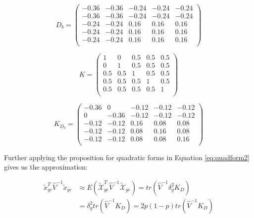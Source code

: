 \documentclass[]{book}
\theoremstyle{definition}
\theoremstyle{definition}
\theoremstyle{definition}
\theoremstyle{remark}
\begin{document}
\begin{equation*} 
D_b = 
\left(\begin{array}{ccccc}
-0.36 & -0.36 & -0.24 & -0.24 & -0.24\\
-0.36 & -0.36 & -0.24 & -0.24 & -0.24\\
-0.24 & -0.24 & 0.16 & 0.16 & 0.16\\
-0.24 & -0.24 & 0.16 & 0.16 & 0.16\\
-0.24 & -0.24 & 0.16 & 0.16 & 0.16\\
\end{array}\right)
\end{equation*}

\begin{equation*} 
K = 
\left(\begin{array}{ccccc}
1 & 0 & 0.5 & 0.5 & 0.5\\
0 & 1 & 0.5 & 0.5 & 0.5\\
0.5 & 0.5 & 1 & 0.5 & 0.5\\
0.5 & 0.5 & 0.5 & 1 & 0.5\\
0.5 & 0.5 & 0.5 & 0.5 & 1\\
\end{array}\right)
\end{equation*}

\begin{equation*} 
K_{D_b} = 
\left(\begin{array}{ccccc}
-0.36 & 0 & -0.12 & -0.12 & -0.12\\
0 & -0.36 & -0.12 & -0.12 & -0.12\\
-0.12 & -0.12 & 0.16 & 0.08 & 0.08\\
-0.12 & -0.12 & 0.08 & 0.16 & 0.08\\
-0.12 & -0.12 & 0.08 & 0.08 & 0.16\\
\end{array}\right)
\end{equation*}

Further applying the proposition for quadratic forms in Equation
\eqref{eq:quadform2} gives us the approximation:

\begin{equation} 
\begin{split}
\tilde{x}_{ge}^T \hat{V}^{-1} \tilde{x}_{ge} & \approx E(\mathcal{\tilde{X}}_{ge}^T \hat{V}^{-1} \mathcal{\tilde{X}}_{ge}) = tr(\hat{V}^{-1} \delta_g^2 K_{D}) \\
& = \delta_g^2 tr(\hat{V}^{-1} K_{D}) = 2 p (1 - p) tr(\hat{V}^{-1} K_{D})
\end{split}
\label{eq:varbetahatlmmge}
\end{equation}
\end{document}
